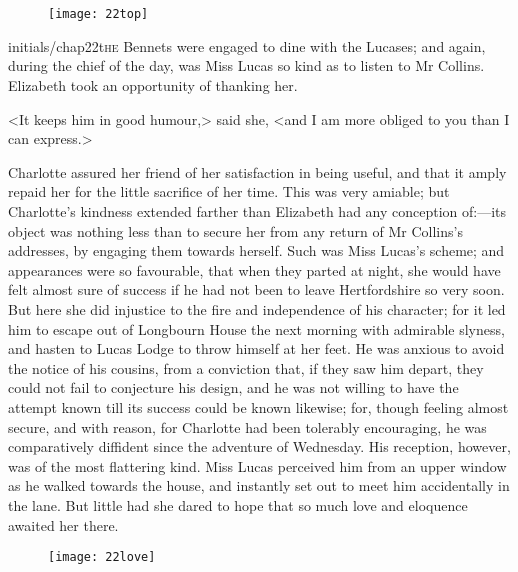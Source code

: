 \chapter[Chapter \thechapter]{}
\begin{figure}[t!]
\centering
\texttt{[image: 22top]}
\end{figure}


\lettrine[lines=6,image=true]{initials/chap22t}{he} Bennets were engaged to dine with the Lucases; and again, during the chief of the day, was Miss Lucas so kind as to listen to Mr Collins. Elizabeth took an opportunity of thanking her. 

\zz
<It keeps him in good humour,> said she, <and I am more obliged to you than I can express.>

\zz
Charlotte assured her friend of her satisfaction in being useful, and that it amply repaid her for the little sacrifice of her time. This was very amiable; but Charlotte's kindness extended farther than Elizabeth had any conception of:—its object was nothing less than to secure her from any return of Mr Collins's addresses, by engaging them towards herself. Such was Miss Lucas's scheme; and appearances were so favourable, that when they parted at night, she would have felt almost sure of success if he had not been to leave Hertfordshire so very soon. But here she did injustice to the fire and independence of his character; for it led him to escape out of Longbourn House the next morning with admirable slyness, and hasten to Lucas Lodge to throw himself at her feet. He was anxious to avoid the notice of his cousins, from a conviction that, if they saw him depart, they could not fail to conjecture his design, and he was not willing to have the attempt known till its success could be known likewise; for, though feeling almost secure, and with reason, for Charlotte had been tolerably encouraging, he was comparatively diffident since the adventure of Wednesday. His reception, however, was of the most flattering kind. Miss Lucas perceived him from an upper window as he walked towards the house, and instantly set out to meet him accidentally in the lane. But little had she dared to hope that so much love and eloquence awaited her there.

\begin{figure}[tbh!]
\centering
\texttt{[image: 22love]}
\end{figure}

